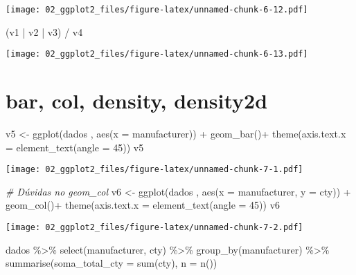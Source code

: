 \documentclass[
]{book}
\newenvironment{Shaded}{\begin{snugshade}}{\end{snugshade}}
\newcommand{\AttributeTok}[1]{\textcolor[rgb]{0.77,0.63,0.00}{#1}}
\newcommand{\CommentTok}[1]{\textcolor[rgb]{0.56,0.35,0.01}{\textit{#1}}}
\newcommand{\DecValTok}[1]{\textcolor[rgb]{0.00,0.00,0.81}{#1}}
\newcommand{\FunctionTok}[1]{\textcolor[rgb]{0.00,0.00,0.00}{#1}}
\newcommand{\NormalTok}[1]{#1}
\newcommand{\OtherTok}[1]{\textcolor[rgb]{0.56,0.35,0.01}{#1}}
\newcommand{\SpecialCharTok}[1]{\textcolor[rgb]{0.00,0.00,0.00}{#1}}
\begin{document}
\texttt{[image: 02\_ggplot2\_files/figure-latex/unnamed-chunk-6-12.pdf]}

\begin{Shaded}
\begin{Highlighting}[]
\NormalTok{(v1 }\SpecialCharTok{|}\NormalTok{ v2 }\SpecialCharTok{|}\NormalTok{ v3) }\SpecialCharTok{/}\NormalTok{ v4}
\end{Highlighting}
\end{Shaded}

\texttt{[image: 02\_ggplot2\_files/figure-latex/unnamed-chunk-6-13.pdf]}

\hypertarget{bar-col-density-density2d}{%
\section{bar, col, density, density2d}\label{bar-col-density-density2d}}

\begin{Shaded}
\begin{Highlighting}[]
\NormalTok{v5 }\OtherTok{\textless{}{-}} \FunctionTok{ggplot}\NormalTok{(dados , }\FunctionTok{aes}\NormalTok{(}\AttributeTok{x =}\NormalTok{ manufacturer)) }\SpecialCharTok{+} 
  \FunctionTok{geom\_bar}\NormalTok{()}\SpecialCharTok{+} 
  \FunctionTok{theme}\NormalTok{(}\AttributeTok{axis.text.x =} \FunctionTok{element\_text}\NormalTok{(}\AttributeTok{angle =} \DecValTok{45}\NormalTok{))}
\NormalTok{v5}
\end{Highlighting}
\end{Shaded}

\texttt{[image: 02\_ggplot2\_files/figure-latex/unnamed-chunk-7-1.pdf]}

\begin{Shaded}
\begin{Highlighting}[]
\CommentTok{\# Dúvidas no geom\_col}
\NormalTok{v6 }\OtherTok{\textless{}{-}} \FunctionTok{ggplot}\NormalTok{(dados , }\FunctionTok{aes}\NormalTok{(}\AttributeTok{x =}\NormalTok{ manufacturer, }\AttributeTok{y =}\NormalTok{ cty)) }\SpecialCharTok{+} 
  \FunctionTok{geom\_col}\NormalTok{()}\SpecialCharTok{+}
  \FunctionTok{theme}\NormalTok{(}\AttributeTok{axis.text.x =} \FunctionTok{element\_text}\NormalTok{(}\AttributeTok{angle =} \DecValTok{45}\NormalTok{))}
\NormalTok{v6}
\end{Highlighting}
\end{Shaded}

\texttt{[image: 02\_ggplot2\_files/figure-latex/unnamed-chunk-7-2.pdf]}

\begin{Shaded}
\begin{Highlighting}[]
\NormalTok{dados }\SpecialCharTok{\%\textgreater{}\%} 
  \FunctionTok{select}\NormalTok{(manufacturer, cty) }\SpecialCharTok{\%\textgreater{}\%} 
  \FunctionTok{group\_by}\NormalTok{(manufacturer) }\SpecialCharTok{\%\textgreater{}\%} 
  \FunctionTok{summarise}\NormalTok{(}\AttributeTok{soma\_total\_cty =} \FunctionTok{sum}\NormalTok{(cty),}
            \AttributeTok{n =} \FunctionTok{n}\NormalTok{())}
\end{Highlighting}
\end{Shaded}
\end{document}

